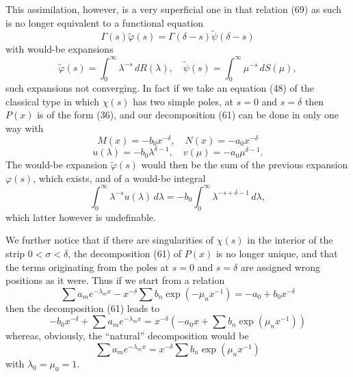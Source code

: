 \documentclass[12pt]{article}
\begin{document}
This assimilation, however, is a very superficial one in that relation (69) as such is no longer equivalent to a functional equation
\begin{equation}
\Gamma(s)\tilde{\varphi}(s) = \Gamma(\delta - s)\tilde{\psi}(\delta - s)
\tag{70}
\end{equation}
with would-be expansions
\begin{equation}
\tilde{\varphi}(s) = \int_{0}^{\infty} \lambda^{-s} \, dR(\lambda), \quad \tilde{\psi}(s) = \int_{0}^{\infty} \mu^{-s} \, dS(\mu),
\tag{71}
\end{equation}
such expansions not converging. In fact if we take an equation (48) of the classical type in which \(\chi(s)\) has two simple poles, at \(s = 0\) and \(s = \delta\) then \(P(x)\) is of the form (36), and our decomposition (61) can be done in only one way with
\begin{equation}
M(x) = -b_0 x^{-\delta}, \quad N(x) = -a_0 x^{-\delta}
\tag{72}
\end{equation}
\begin{equation}
u(\lambda) = -b_0 \lambda^{\delta-1}, \quad v(\mu) = -a_0 \mu^{\delta-1}.
\tag{73}
\end{equation}
The would-be expansion \(\tilde{\varphi}(s)\) would then be the sum of the previous expansion \(\varphi(s)\), which exists, and of a would-be integral
\[
\int_{0}^{\infty} \lambda^{-s} u(\lambda) \, d\lambda = -b_0 \int_{0}^{\infty} \lambda^{-s+\delta-1} \, d\lambda,
\]
which latter however is undefinable.

We further notice that if there are singularities of \(\chi(s)\) in the interior of the strip \(0 < \sigma < \delta\), the decomposition (61) of \(P(x)\) is no longer unique, and that the terms originating from the poles at \(s = 0\) and \(s = \delta\) are assigned wrong positions as it were. Thus if we start from a relation
\begin{equation}
\sum a_m e^{-\lambda_m x} - x^{-\delta} \sum b_n \exp(-\mu_n x^{-1}) = -a_0 + b_0 x^{-\delta}
\tag{74}
\end{equation}
then the decomposition (61) leads to
\begin{equation}
-b_0 x^{-\delta} + \sum a_m e^{-\lambda_m x} = x^{-\delta} (-a_0 x + \sum b_n \exp(\mu_n x^{-1}))
\tag{75}
\end{equation}
whereas, obviously, the ``natural'' decomposition would be
\begin{equation}
\sum a_m e^{-\lambda_m x} = x^{-\delta} \sum b_n \exp(\mu_n x^{-1})
\tag{76}
\end{equation}
with \(\lambda_0 = \mu_0 = 1\).
\end{document}
